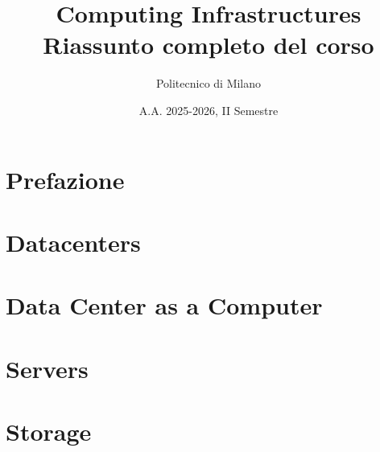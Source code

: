 \documentclass[11pt,a4paper]{article}
\title{\textbf{Computing Infrastructures}\\
\large Riassunto completo del corso}
\author{Politecnico di Milano}
\date{A.A. 2025-2026, II Semestre}
\newcommand{\folder}{Chapters/} %
\begin{document}
\maketitle
\tableofcontents
\newpage

\section{Prefazione}


\section{Datacenters}


\section{Data Center as a Computer}


\section{Servers}


\section{Storage}

\end{document}
